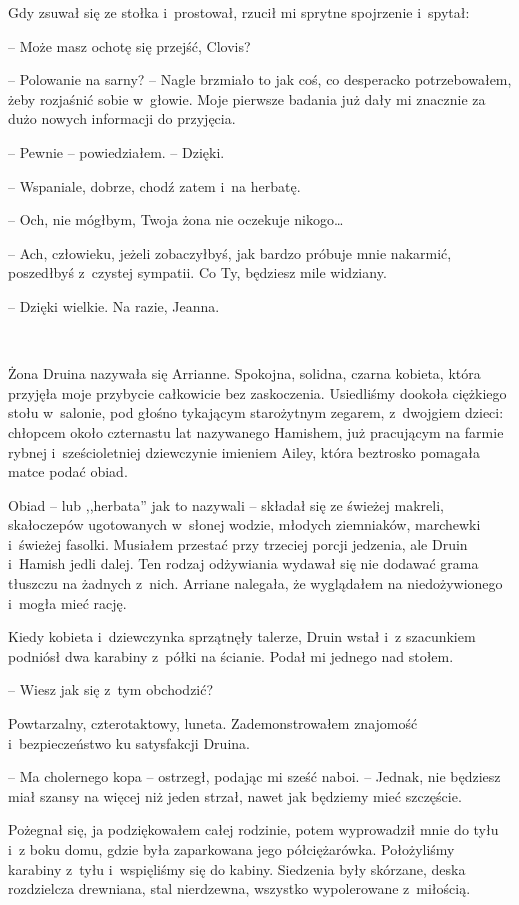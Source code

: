 \documentclass[oneside,polish,11pt,sfheadings]{mwbk}
\begin{document}
Gdy zsuwał się ze stołka i~prostował, rzucił mi sprytne spojrzenie i~spytał: 

-- Może masz ochotę się przejść, Clovis?

-- Polowanie na sarny? -- Nagle brzmiało to jak coś, co desperacko
potrzebowałem, żeby rozjaśnić sobie w~głowie. Moje pierwsze badania już
dały mi znacznie za dużo nowych informacji do przyjęcia.

-- Pewnie -- powiedziałem. -- Dzięki.

-- Wspaniale, dobrze, chodź zatem i~na herbatę.

-- Och, nie mógłbym, Twoja żona nie oczekuje nikogo\ldots

-- Ach, człowieku, jeżeli zobaczyłbyś, jak bardzo próbuje mnie nakarmić,
poszedłbyś z~czystej sympatii. Co Ty, będziesz mile widziany.

-- Dzięki wielkie. Na razie, Jeanna.

~

Żona Druina nazywała się Arrianne. Spokojna, solidna, czarna kobieta,
która przyjęła moje przybycie całkowicie bez zaskoczenia. Usiedliśmy
dookoła ciężkiego stołu w~salonie, pod głośno tykającym starożytnym
zegarem, z~dwojgiem dzieci: chłopcem około czternastu lat nazywanego
Hamishem, już pracującym na farmie rybnej i~sześcioletniej dziewczynie
imieniem Ailey, która beztrosko pomagała matce podać obiad.

Obiad -- lub ,,herbata'' jak to nazywali -- składał się ze świeżej
makreli, skałoczepów ugotowanych w~słonej wodzie, młodych ziemniaków,
marchewki i~świeżej fasolki. Musiałem przestać przy trzeciej porcji
jedzenia, ale Druin i~Hamish jedli dalej. Ten rodzaj odżywiania wydawał
się nie dodawać grama tłuszczu na żadnych z~nich. Arriane nalegała, że
wyglądałem na niedożywionego i~mogła mieć rację.

Kiedy kobieta i~dziewczynka sprzątnęły talerze, Druin wstał i~z szacunkiem podniósł dwa karabiny z~półki na ścianie. Podał mi jednego
nad stołem.

-- Wiesz jak się z~tym obchodzić?

Powtarzalny, czterotaktowy, luneta. Zademonstrowałem znajomość i~bezpieczeństwo ku satysfakcji Druina.

-- Ma cholernego kopa -- ostrzegł, podając mi sześć naboi. -- Jednak, nie
będziesz miał szansy na więcej niż jeden strzał, nawet jak będziemy mieć
szczęście.

Pożegnał się, ja podziękowałem całej rodzinie, potem wyprowadził mnie do
tyłu i~z boku domu, gdzie była zaparkowana jego półciężarówka.
Położyliśmy karabiny z~tyłu i~wspięliśmy się do kabiny. Siedzenia były
skórzane, deska rozdzielcza drewniana, stal nierdzewna, wszystko
wypolerowane z~miłością.
\end{document}
